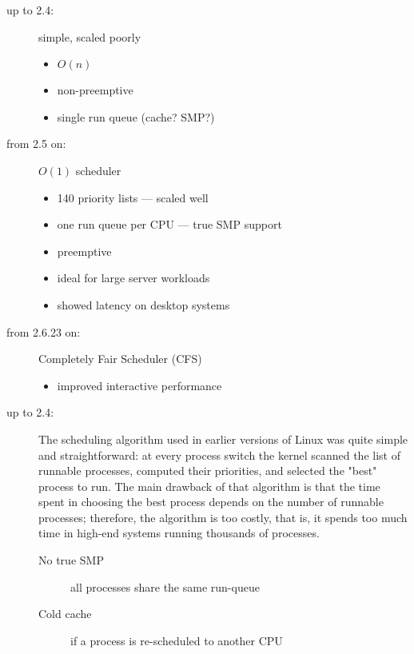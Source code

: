 \begin{frame}
  \begin{description}
  \item[up to 2.4:] simple, scaled poorly
    \begin{multicols}{2}
      \begin{itemize}
      \item $O(n)$
      \item non-preemptive
      \item single run queue (cache? SMP?)
      \end{itemize}
    \end{multicols}
  \item[from 2.5 on:] $O(1)$ scheduler
    \begin{itemize}
    \item 140 priority lists --- scaled well
    \item one run queue per CPU --- true SMP support
    \item preemptive
    \item ideal for large server workloads
    \item showed latency on desktop systems
    \end{itemize}
  \item[from 2.6.23 on:] Completely Fair Scheduler (CFS)
    \begin{itemize}
    \item improved interactive performance
    \end{itemize}
  \end{description}
\end{frame}

\begin{description}
\item[up to 2.4:]  The scheduling algorithm used in earlier versions
  of Linux was quite simple and straightforward: at every process switch the kernel
  scanned the list of runnable processes, computed their priorities, and selected the
  "best" process to run. The main drawback of that algorithm is that the time spent in
  choosing the best process depends on the number of runnable processes; therefore, the
  algorithm is too costly, that is, it spends too much time in high-end systems running
  thousands of processes.
  \begin{description}
  \item[No true SMP] all processes share the same run-queue
  \item[Cold cache] if a process is re-scheduled to another CPU
  \end{description}
\end{description}

